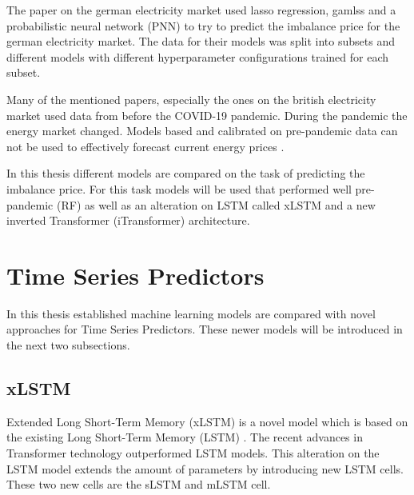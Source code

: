 \documentclass[class=scrbook, crop=false]{standalone}
\begin{document}
The paper on the german electricity market \cite{narajewskiProbabilisticForecastingGerman2022} used lasso regression, gamlss and a probabilistic neural network (PNN) to try to predict the imbalance price for the german electricity market. The data for their models was split into subsets and different models with different hyperparameter configurations trained for each subset.

Many of the mentioned papers, especially the ones on the british electricity market used data from before the COVID-19 pandemic. During the pandemic the energy market changed. Models based and calibrated on pre-pandemic data can not be used to effectively forecast current energy prices \cite{abadieEnergyMarketPrices2021}.


In this thesis different models are compared on the task of predicting the imbalance price. For this task models will be used that performed well pre-pandemic (RF) as well as an alteration on LSTM called xLSTM \cite{beckXLSTMExtendedLong2024} and a new inverted Transformer (iTransformer) \cite{liuITransformerInvertedTransformers2023} architecture.


\section{Time Series Predictors}
\label{Section::Time_Series_Predictors}

In this thesis established machine learning models are compared with novel approaches for Time Series Predictors. These newer models will be introduced in the next two subsections.




\subsection{xLSTM}
\label{Section::xLSTM}
Extended Long Short-Term Memory (xLSTM) is a novel model which is based on the existing Long Short-Term Memory (LSTM) \cite{gravesLongShortTermMemory2012}. The recent advances in Transformer technology outperformed LSTM models. This alteration on the LSTM model extends  the amount of parameters by introducing new LSTM cells. 
These two new cells are the sLSTM and mLSTM cell.
\end{document}
